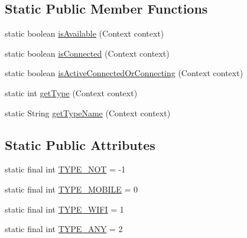\subsection*{Static Public Member Functions}
\begin{DoxyCompactItemize}
\item 
static boolean \hyperlink{classcom_1_1toast_1_1android_1_1gamebase_1_1base_1_1_network_manager_a2ef8f8a09a032328b794081b48aee5ae}{is\+Available} (Context context)
\item 
static boolean \hyperlink{classcom_1_1toast_1_1android_1_1gamebase_1_1base_1_1_network_manager_ac05a319bf54200b21a1c0891f54e1944}{is\+Connected} (Context context)
\item 
static boolean \hyperlink{classcom_1_1toast_1_1android_1_1gamebase_1_1base_1_1_network_manager_a5dffe423ce2f36eb4c3d9365516f8d10}{is\+Active\+Connected\+Or\+Connecting} (Context context)
\item 
static int \hyperlink{classcom_1_1toast_1_1android_1_1gamebase_1_1base_1_1_network_manager_a330b1eb0d59635175f979b5c71fa1a55}{get\+Type} (Context context)
\item 
static String \hyperlink{classcom_1_1toast_1_1android_1_1gamebase_1_1base_1_1_network_manager_afe7b2be3300d52524f2e9aaed5a05d5d}{get\+Type\+Name} (Context context)
\end{DoxyCompactItemize}
\subsection*{Static Public Attributes}
\begin{DoxyCompactItemize}
\item 
static final int \hyperlink{classcom_1_1toast_1_1android_1_1gamebase_1_1base_1_1_network_manager_ab6a262f93c8f7b229f0d9968f15ae328}{T\+Y\+P\+E\+\_\+\+N\+OT} = -\/1
\item 
static final int \hyperlink{classcom_1_1toast_1_1android_1_1gamebase_1_1base_1_1_network_manager_acdbf2cda592e7b95d250246e4eab7cee}{T\+Y\+P\+E\+\_\+\+M\+O\+B\+I\+LE} = 0
\item 
static final int \hyperlink{classcom_1_1toast_1_1android_1_1gamebase_1_1base_1_1_network_manager_acf729cc484f4b6d0e535f19ed31614b5}{T\+Y\+P\+E\+\_\+\+W\+I\+FI} = 1
\item 
static final int \hyperlink{classcom_1_1toast_1_1android_1_1gamebase_1_1base_1_1_network_manager_ac89feff3bdce716ffc4abafec7cc04d4}{T\+Y\+P\+E\+\_\+\+A\+NY} = 2
\end{DoxyCompactItemize}


